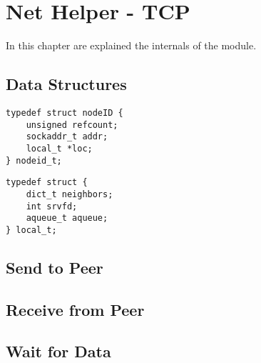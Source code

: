 \section{Net Helper - TCP}
In this chapter are explained the internals of the module. 

\subsection{Data Structures}

\begin{lstlisting}
typedef struct nodeID {
    unsigned refcount;
    sockaddr_t addr;
    local_t *loc;
} nodeid_t;
\end{lstlisting}


\begin{lstlisting}
typedef struct {
    dict_t neighbors;
    int srvfd;
    aqueue_t aqueue;
} local_t;
\end{lstlisting}


\subsection{Send to Peer}

\subsection{Receive from Peer}

\subsection{Wait for Data}
